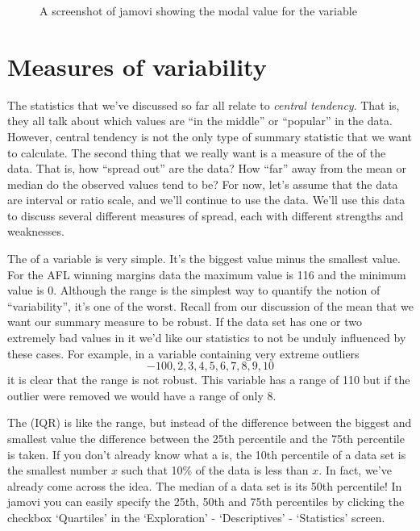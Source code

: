 \vspace{0.5cm}
\begin{figure}[!!htb]
\begin{center}
\caption{A screenshot of jamovi showing the modal value for the  variable }
\label{fig:aflsmall_margins_mode}
\HR
\end{center}
\end{figure}


\section{Measures of variability\label{sec:var}}

The statistics that we've discussed so far all relate to {\it central tendency}. That is, they all talk about which values are ``in the middle'' or ``popular'' in the data. However, central tendency is not the only type of summary statistic that we want to calculate. The second thing that we really want is a measure of the  of the data. That is, how ``spread out'' are the data? How ``far'' away from the mean or median do the observed values tend to be? For now, let's assume that the data are interval or ratio scale, and we'll continue to use the  data.  We'll use this data to discuss several different measures of spread, each with different strengths and weaknesses. 


The  of a variable is very simple. It's the biggest value minus the smallest value. For the AFL winning margins data the maximum value is 116 and the minimum value is 0. Although the range is the simplest way to quantify the notion of ``variability'', it's one of the worst. Recall from our discussion of the mean that we want our summary measure to be robust. If the data set has one or two extremely bad values in it we'd like our statistics to not be unduly influenced by these cases. For example, in a variable containing very extreme outliers 
$$
-100,2,3,4,5,6,7,8,9,10
$$
it is clear that the range is not robust. This variable has a range of 110 but if the outlier were removed we would have a range of only 8.


The  (IQR) is like the range, but instead of the difference between the biggest and smallest value the difference between the 25th percentile and the 75th percentile is taken. If you don't already know what a  is, the 10th percentile of a data set is the smallest number $x$ such that 10\% of the data is less than $x$. In fact, we've already come across the idea. The median of a data set is its 50th percentile! In jamovi you can easily specify the 25th, 50th and 75th percentiles by clicking the checkbox `Quartiles' in the `Exploration' - `Descriptives' - `Statistics' screen. 

